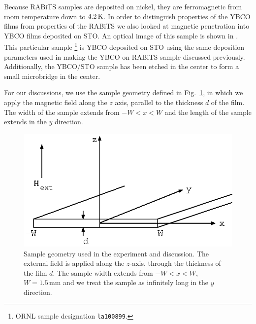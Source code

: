 Because RABiTS samples are deposited on nickel, they are 
ferromagnetic from room temperature down to $4.2\,\kelvin$. 
In order to distinguish properties of the YBCO films
from properties of the RABiTS we also looked at magnetic penetration into 
YBCO films 
deposited on STO.
An optical image of this sample is shown in .
This particular sample%
\footnote{ORNL sample designation \texttt{la100899}.} 
is YBCO deposited on STO using the same
deposition parameters used in making the YBCO on RABiTS sample 
discussed previously. Additionally, the YBCO/STO sample has been
etched in the center to form a small microbridge in the center. 


%
%
For our discussions, we use the sample geometry defined in 
Fig.~\ref{fig:geometry}, in which we apply the magnetic field
along the $z$ axis, parallel to the thickness $d$ of the film. 
The width of the sample extends from $-W < x < W$ and the length
of the sample extends in the $y$ direction.

%
%
%
\begin{figure}[p]
\includegraphics{figs/magpen/fig2.eps}
\caption[Sample geometry used magnetic penetration experiment analysis.]
{Sample geometry used in the experiment and discussion.
The external field is applied along the $z$-axis, through the 
thickness of the film $d$. The sample width extends from $-W < x < W$,
$W=1.5\,\mathrm{mm}$
and we treat the sample as infinitely long in the $y$ direction. 
}
\label{fig:geometry}
\end{figure}


